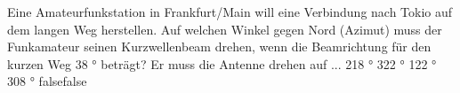     {Eine Amateurfunkstation in Frankfurt/Main will eine Verbindung nach Tokio auf dem langen Weg herstellen. Auf welchen Winkel gegen Nord (Azimut) muss der Funkamateur seinen Kurzwellenbeam drehen, wenn die Beamrichtung für den kurzen Weg 38 ° beträgt? Er muss die Antenne drehen auf ...}
    {218 °}
    {322 °}
    {122 °}
    {308 °}
    {false}{false}